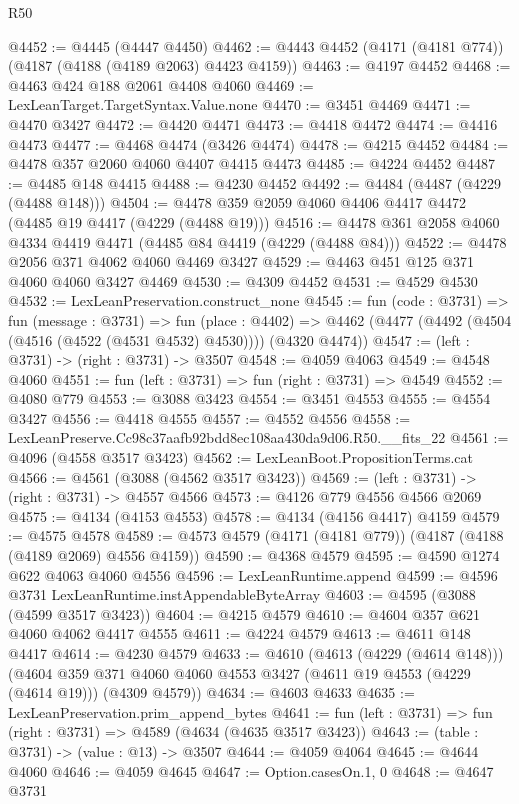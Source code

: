 \begin{lexlean}{R50}
\begin{coremodule}
@4452 := @4445 (@4447 @4450)
@4462 := @4443 @4452 (@4171 (@4181 @774)) (@4187 (@4188 (@4189 @2063) @4423 @4159))
@4463 := @4197 @4452
@4468 := @4463 @424 @188 @2061 @4408 @4060
@4469 := LexLeanTarget.TargetSyntax.Value.none
@4470 := @3451 @4469
@4471 := @4470 @3427
@4472 := @4420 @4471
@4473 := @4418 @4472
@4474 := @4416 @4473
@4477 := @4468 @4474 (@3426 @4474)
@4478 := @4215 @4452
@4484 := @4478 @357 @2060 @4060 @4407 @4415 @4473
@4485 := @4224 @4452
@4487 := @4485 @148 @4415
@4488 := @4230 @4452
@4492 := @4484 (@4487 (@4229 (@4488 @148)))
@4504 := @4478 @359 @2059 @4060 @4406 @4417 @4472 (@4485 @19 @4417 (@4229 (@4488 @19)))
@4516 := @4478 @361 @2058 @4060 @4334 @4419 @4471 (@4485 @84 @4419 (@4229 (@4488 @84)))
@4522 := @4478 @2056 @371 @4062 @4060 @4469 @3427
@4529 := @4463 @451 @125 @371 @4060 @4060 @3427 @4469
@4530 := @4309 @4452
@4531 := @4529 @4530
@4532 := LexLeanPreservation.construct_none
@4545 := fun (code : @3731) =>
  fun (message : @3731) =>
  fun (place : @4402) =>
  @4462 (@4477 (@4492 (@4504 (@4516 (@4522 (@4531 @4532) @4530)))) (@4320 @4474))
@4547 := (left : @3731) -> (right : @3731) -> @3507
@4548 := @4059 @4063
@4549 := @4548 @4060
@4551 := fun (left : @3731) => fun (right : @3731) => @4549
@4552 := @4080 @779
@4553 := @3088 @3423
@4554 := @3451 @4553
@4555 := @4554 @3427
@4556 := @4418 @4555
@4557 := @4552 @4556
@4558 := LexLeanPreserve.Cc98c37aafb92bdd8ec108aa430da9d06.R50.__fits_22
@4561 := @4096 (@4558 @3517 @3423)
@4562 := LexLeanBoot.PropositionTerms.cat
@4566 := @4561 (@3088 (@4562 @3517 @3423))
@4569 := (left : @3731) -> (right : @3731) -> @4557 @4566
@4573 := @4126 @779 @4556 @4566 @2069
@4575 := @4134 (@4153 @4553)
@4578 := @4134 (@4156 @4417) @4159
@4579 := @4575 @4578
@4589 := @4573 @4579 (@4171 (@4181 @779)) (@4187 (@4188 (@4189 @2069) @4556 @4159))
@4590 := @4368 @4579
@4595 := @4590 @1274 @622 @4063 @4060 @4556
@4596 := LexLeanRuntime.append
@4599 := @4596 @3731 LexLeanRuntime.instAppendableByteArray
@4603 := @4595 (@3088 (@4599 @3517 @3423))
@4604 := @4215 @4579
@4610 := @4604 @357 @621 @4060 @4062 @4417 @4555
@4611 := @4224 @4579
@4613 := @4611 @148 @4417
@4614 := @4230 @4579
@4633 := @4610
    (@4613 (@4229 (@4614 @148)))
    (@4604 @359 @371 @4060 @4060 @4553 @3427 (@4611 @19 @4553 (@4229 (@4614 @19))) (@4309 @4579))
@4634 := @4603 @4633
@4635 := LexLeanPreservation.prim_append_bytes
@4641 := fun (left : @3731) => fun (right : @3731) => @4589 (@4634 (@4635 @3517 @3423))
@4643 := (table : @3731) -> (value : @13) -> @3507
@4644 := @4059 @4064
@4645 := @4644 @4060
@4646 := @4059 @4645
@4647 := Option.casesOn.{1, 0}
@4648 := @4647 @3731

\end{coremodule}
\end{lexlean}
